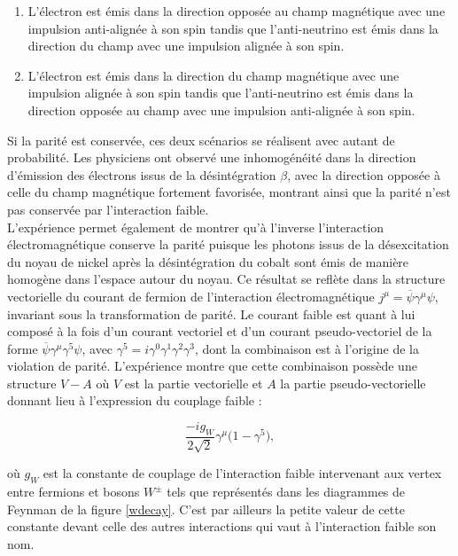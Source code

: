         \begin{enumerate}
            \item L'électron est émis dans la direction opposée au champ magnétique avec une impulsion anti-alignée à son spin tandis que l'anti-neutrino est émis dans la direction du champ avec une impulsion alignée à son spin.
            \item L'électron est émis dans la direction du champ magnétique avec une impulsion alignée à son spin tandis que l'anti-neutrino est émis dans la direction opposée au champ avec une impulsion anti-alignée à son spin.
        \end{enumerate}

        Si la parité est conservée, ces deux scénarios se réalisent avec autant de probabilité. Les physiciens ont observé une inhomogénéité dans la direction d'émission des électrons issus de la désintégration $\beta$, avec la direction opposée à celle du champ magnétique fortement favorisée, montrant ainsi que la parité n'est pas conservée par l'interaction faible. \\
        
        L'expérience permet également de montrer qu'à l'inverse l'interaction électromagnétique conserve la parité puisque les photons issus de la désexcitation du noyau de nickel après la désintégration du cobalt sont émis de manière homogène dans l'espace autour du noyau. Ce résultat se reflète dans la structure vectorielle du courant de fermion de l'interaction électromagnétique $j^{\mu}=\overline{\psi}\gamma^{\mu}\psi$, invariant sous la transformation de parité. Le courant faible est quant à lui composé à la fois d'un courant vectoriel et d'un courant pseudo-vectoriel de la forme $\overline{\psi}\gamma^{\mu}\gamma^5\psi$, avec $\gamma^5=i\gamma^0\gamma^1\gamma^2\gamma^3$, dont la combinaison est à l'origine de la violation de parité. L'expérience montre que cette combinaison possède une structure $V-A$ où $V$ est la partie vectorielle et $A$ la partie pseudo-vectorielle donnant lieu à l'expression du couplage faible :

        \begin{equation}
            \boxed{
            \frac{-ig_W}{2\sqrt{2}}\gamma^{\mu}\bigl(1-\gamma^5\bigr),
            }
        \end{equation}

        où $g_W$ est la constante de couplage de l'interaction faible intervenant aux vertex entre fermions et bosons $W^{\pm}$ tels que représentés dans les diagrammes de Feynman de la figure \ref{wdecay}. C'est par ailleurs la petite valeur de cette constante devant celle des autres interactions qui vaut à l'interaction faible son nom.\\
        
